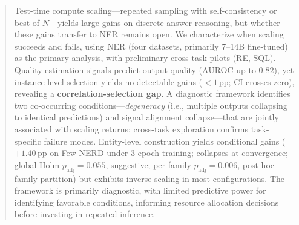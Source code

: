 \begin{abstract}
Test-time compute scaling---repeated sampling with self-consistency or best-of-$N$---yields large gains on discrete-answer reasoning, but whether these gains transfer to NER remains open.
We characterize when scaling succeeds and fails, using NER (four datasets, primarily 7--14B fine-tuned) as the primary analysis, with preliminary cross-task pilots (RE, SQL).
Quality estimation signals predict output quality (AUROC up to $0.82$), yet instance-level selection yields no detectable gains (${<}1$\,pp; CI crosses zero), revealing a \textbf{correlation-selection gap}.
A diagnostic framework identifies two co-occurring conditions---\textit{degeneracy} (i.e., multiple outputs collapsing to identical predictions) and signal alignment collapse---that are jointly associated with scaling returns; cross-task exploration confirms task-specific failure modes.
Entity-level construction yields conditional gains ($+1.40$\,pp on Few-NERD under 3-epoch training; collapses at convergence; global Holm $p_{\text{adj}}{=}0.055$, suggestive; per-family $p_{\text{adj}}{=}0.006$, post-hoc family partition) but exhibits inverse scaling in most configurations.
The framework is primarily diagnostic, with limited predictive power for identifying favorable conditions, informing resource allocation decisions before investing in repeated inference.
\end{abstract}
